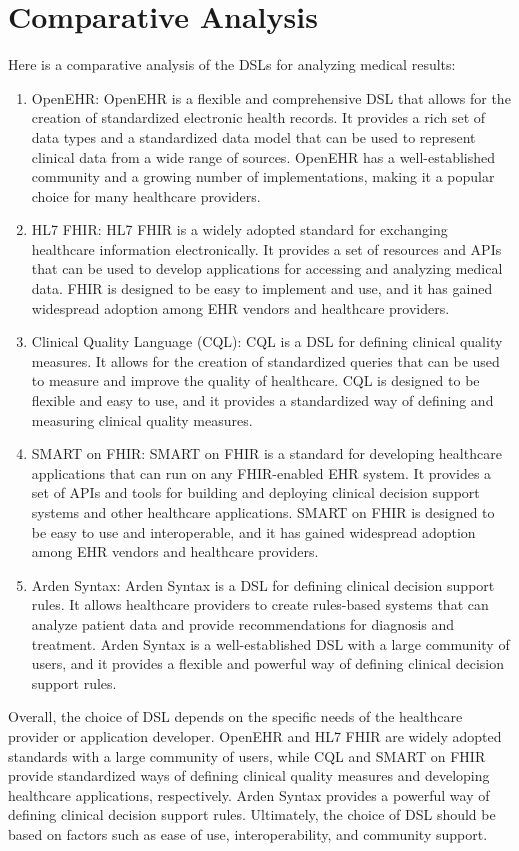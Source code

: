 \vspace{0.5cm}
\section{Comparative Analysis}

Here is a comparative analysis of the DSLs for analyzing medical results:
\begin{enumerate}
\item OpenEHR: OpenEHR is a flexible and comprehensive DSL that allows for the creation of standardized electronic health records. It provides a rich set of data types and a standardized data model that can be used to represent clinical data from a wide range of sources. OpenEHR has a well-established community and a growing number of implementations, making it a popular choice for many healthcare providers.

\item HL7 FHIR: HL7 FHIR is a widely adopted standard for exchanging healthcare information electronically. It provides a set of resources and APIs that can be used to develop applications for accessing and analyzing medical data. FHIR is designed to be easy to implement and use, and it has gained widespread adoption among EHR vendors and healthcare providers.

\item Clinical Quality Language (CQL): CQL is a DSL for defining clinical quality measures. It allows for the creation of standardized queries that can be used to measure and improve the quality of healthcare. CQL is designed to be flexible and easy to use, and it provides a standardized way of defining and measuring clinical quality measures.

\item SMART on FHIR: SMART on FHIR is a standard for developing healthcare applications that can run on any FHIR-enabled EHR system. It provides a set of APIs and tools for building and deploying clinical decision support systems and other healthcare applications. SMART on FHIR is designed to be easy to use and interoperable, and it has gained widespread adoption among EHR vendors and healthcare providers.

\item Arden Syntax: Arden Syntax is a DSL for defining clinical decision support rules. It allows healthcare providers to create rules-based systems that can analyze patient data and provide recommendations for diagnosis and treatment. Arden Syntax is a well-established DSL with a large community of users, and it provides a flexible and powerful way of defining clinical decision support rules.
\end{enumerate}
Overall, the choice of DSL depends on the specific needs of the healthcare provider or application developer. OpenEHR and HL7 FHIR are widely adopted standards with a large community of users, while CQL and SMART on FHIR provide standardized ways of defining clinical quality measures and developing healthcare applications, respectively. Arden Syntax provides a powerful way of defining clinical decision support rules. Ultimately, the choice of DSL should be based on factors such as ease of use, interoperability, and community support.

